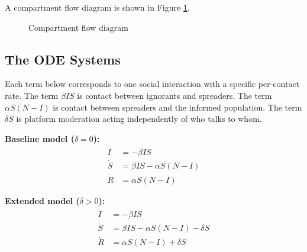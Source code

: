 \documentclass[12pt]{article}
\begin{document}
A compartment flow diagram is shown in Figure \ref{fig:compartments}.

\begin{figure}[h]
\centering
{}
\caption{Compartment flow diagram}
\label{fig:compartments}
\end{figure}

\subsection{The ODE Systems}

Each term below corresponds to one social interaction with a specific
per-contact rate. The term $\beta IS$ is contact between
ignorants and spreaders. The term $\alpha S(N - I)$ is contact
between spreaders and the informed population. The term $\delta S$ is
platform moderation acting independently of who talks to whom.

\textbf{Baseline model ($\delta = 0$):}
\begin{align*}
\dot{I} &= -\beta IS \\
\dot{S} &= \beta IS - \alpha S(N - I) \\
\dot{R} &= \alpha S(N - I)
\end{align*}

\textbf{Extended model ($\delta > 0$):}
\begin{align*}
\dot{I} &= -\beta IS \\
\dot{S} &= \beta IS - \alpha S(N - I) - \delta S \\
\dot{R} &= \alpha S(N - I) + \delta S
\end{align*}
\end{document}
